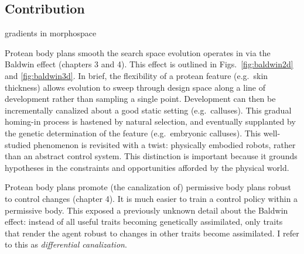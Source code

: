 \subsection{Contribution}

gradients in morphospace

Protean body plans smooth the search space evolution operates in via the Baldwin effect (chapters 3 and 4).
This effect is outlined in Figs.~\ref{fig:baldwin2d} and \ref{fig:baldwin3d}.
In brief, the flexibility of a protean feature
(e.g.~skin thickness) allows evolution to sweep through design space along a line of development rather than sampling a single point.
Development can then be incrementally canalized about a good static setting (e.g.~calluses).
This gradual homing-in process is hastened by natural selection,
and eventually supplanted by the genetic determination of the feature 
(e.g.~embryonic calluses).
This well-studied phenomenon is revisited with a twist:
physically embodied robots, rather than an abstract control system.
This distinction is important because it grounds hypotheses in the constraints and opportunities afforded by the physical world.


Protean body plans promote (the canalization of) permissive body plans robust to control changes (chapter 4).
It is much easier to train a control policy within a permissive body. 
This exposed a previously unknown detail about the Baldwin effect: instead of all useful traits becoming genetically assimilated, only traits that render the agent robust to changes in other traits become assimilated. 
I refer to this as \textit{differential canalization}.


